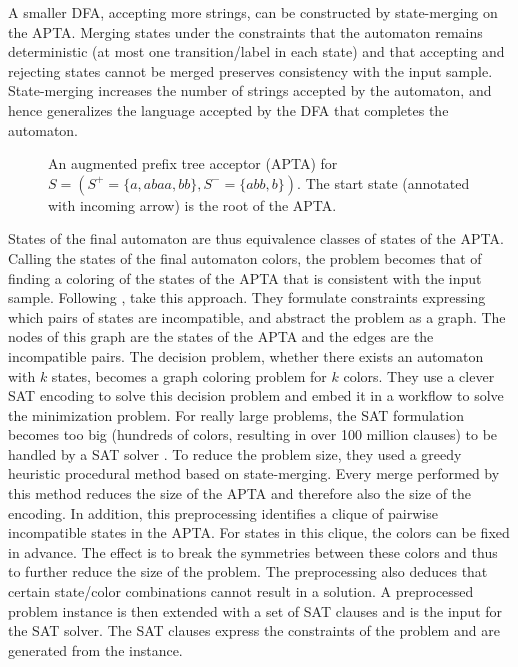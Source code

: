 \documentclass{tlp}
\renewcommand{\|}{\ensuremath{\,|\,}}
\renewcommand{\|}{\,|\,}
\begin{document}
A smaller DFA, accepting more strings, can be constructed by
state-merging on the APTA.  Merging states under the constraints that
the automaton remains deterministic (at most one transition/label in
each state) and that accepting and rejecting states cannot be merged
preserves consistency with the input sample. State-merging increases
the number of strings accepted by the automaton, and hence generalizes
the language accepted by the DFA that completes the automaton.

\begin{figure}[t]
\begin{center}
\caption{An augmented prefix tree acceptor (APTA) for $S = (S^+ = \{a,
  abaa, bb\}, S^- = \{abb,b\})$. The start state (annotated with
  incoming arrow) is the root of the APTA.  }
\label{fig:apta}
\end{center}
\end{figure}

States of the final automaton are thus equivalence classes of states
of the APTA.  Calling the states of the final automaton colors, the
problem becomes that of finding a coloring of the states of the APTA
that is consistent with the input sample. Following ,
 take this approach. They formulate constraints
expressing which pairs of states are incompatible, and abstract the
problem as a graph.  The nodes of this graph are the states of the
APTA and the edges are the incompatible pairs. The decision problem,
whether there exists an automaton with $k$ states, becomes a graph
coloring problem for $k$ colors. They use a clever SAT encoding to
solve this decision problem and embed it in a workflow to solve the
minimization problem.  For really large problems, the SAT formulation
becomes too big (hundreds of colors, resulting in over 100 million
clauses) to be handled by a SAT solver \cite{Verwer}. To reduce the
problem size, they used a greedy heuristic procedural method based on
state-merging. Every merge performed by this method reduces the size
of the APTA and therefore also the size of the encoding. In addition,
this preprocessing identifies a clique of pairwise incompatible states
in the APTA. For states in this clique, the colors can be fixed in
advance. The effect is to break the symmetries between these colors
and thus to further reduce the size of the problem.
%
The preprocessing also deduces that certain
state/color combinations cannot result in a solution.  A preprocessed
problem instance is then extended with a set of SAT clauses and is the
input for the SAT solver. The SAT clauses express the constraints of
the problem and are generated from the instance.
\end{document}
